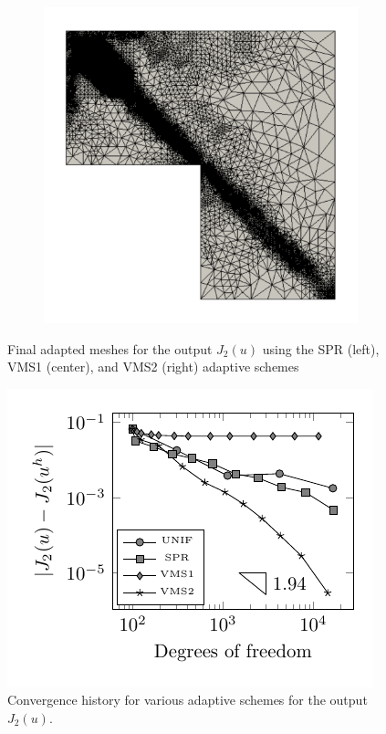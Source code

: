 \begin{figure}[hbt!]
\begin{subfigure}{.3\textwidth}
\end{subfigure}%
\begin{subfigure}{.3\textwidth}
\centering
\includegraphics[width=.99\linewidth]{img/vms_lshape_square_vms2_final}
\end{subfigure}
\caption{Final adapted meshes for the output $J_2(u)$ using
the SPR (left), VMS1 (center), and VMS2 (right) adaptive schemes}
\label{fig:J2_meshes}
\end{figure}

\begin{figure}[hbt!]
\centering
\includegraphics[width=.75\linewidth]{img/vms_lshape_square_convergence}
\caption{Convergence history for various adaptive schemes for
the output $J_2(u)$.}
\label{fig:J2_convergence}
\end{figure}

